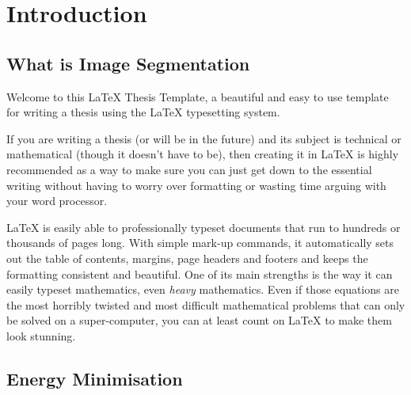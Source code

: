 
\chapter{Introduction} %

\label{Chapter1} %


\newcommand{\keyword}[1]{\textbf{#1}}
\newcommand{\tabhead}[1]{\textbf{#1}}
\newcommand{\code}[1]{\texttt{#1}}
\newcommand{\file}[1]{\texttt{\bfseries#1}}
\newcommand{\option}[1]{\texttt{\itshape#1}}


\section{What is Image Segmentation}
Welcome to this \LaTeX{} Thesis Template, a beautiful and easy to use template for writing a thesis using the \LaTeX{} typesetting system.

If you are writing a thesis (or will be in the future) and its subject is technical or mathematical (though it doesn't have to be), then creating it in \LaTeX{} is highly recommended as a way to make sure you can just get down to the essential writing without having to worry over formatting or wasting time arguing with your word processor.

\LaTeX{} is easily able to professionally typeset documents that run to hundreds or thousands of pages long. With simple mark-up commands, it automatically sets out the table of contents, margins, page headers and footers and keeps the formatting consistent and beautiful. One of its main strengths is the way it can easily typeset mathematics, even \emph{heavy} mathematics. Even if those equations are the most horribly twisted and most difficult mathematical problems that can only be solved on a super-computer, you can at least count on \LaTeX{} to make them look stunning.


\section{Energy Minimisation}

